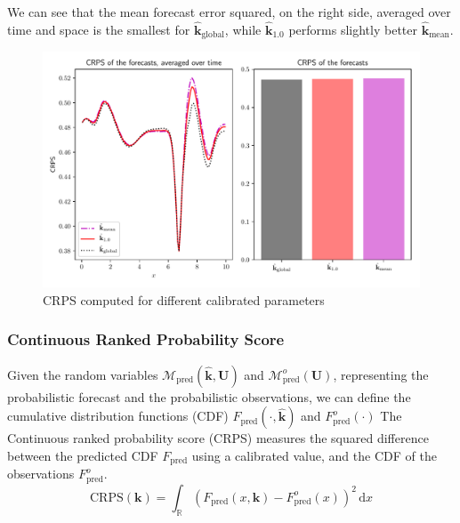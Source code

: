 \documentclass[preprint, 1p]{elsarticle}
\newcommand{\hatkmean}{\hat{\mathbf{k}}_{\mathrm{mean}}}
\newcommand{\kest}{\hat{\mathbf{k}}}
\newcommand{\victor}[1]{{\itshape\color{green} ({#1})}}
\begin{document}
We can see that the mean forecast error squared, on the right side, averaged over time and space is the smallest for $\kest_{\mathrm{global}}$, while $\kest_{1.0}$ performs slightly better $\hatkmean$.
\begin{figure}[!h]
  \centering
  \includegraphics[width=.9\textwidth]{Figures/forecast_CRPS}
  \caption{CRPS computed for different calibrated parameters}
\label{fig:forecast_crps}
\end{figure}


\subsubsection{Continuous Ranked Probability Score}
Given the random variables $\mathcal{M}_{\mathrm{pred}}(\kest, \mathbf{U})$ and $\mathcal{M}_{\mathrm{pred}}^o(\mathbf{U})$, representing the probabilistic forecast and the probabilistic observations, we can define the cumulative distribution functions (CDF) $F_{\mathrm{pred}}(\cdot, \kest)$ and $F^o_{\mathrm{pred}}(\cdot)$
The Continuous ranked probability score (CRPS) measures the squared difference between the predicted CDF $F_{\mathrm{pred}}$ using a calibrated value, and the CDF of the observations $F_{\mathrm{pred}}^o$. 
\begin{equation}
\label{eq:def_crps}
\mathrm{CRPS}(\mathbf{k}) = \int_{\mathbb{R}} (F_{\mathrm{pred}}(x,\mathbf{k}) - F^o_{\mathrm{pred}}(x))^2 \,\mathrm{d}x
\end{equation}
\end{document}
